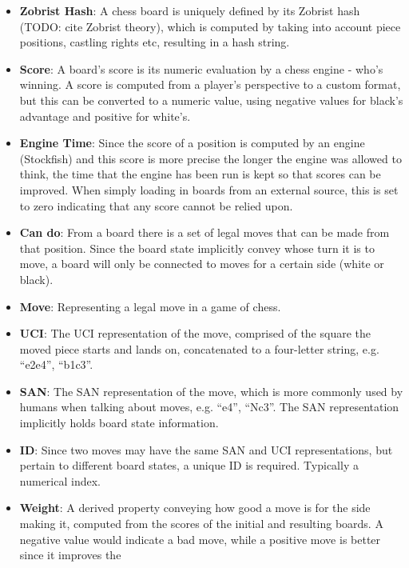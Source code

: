 \documentclass[architecture.tex]{subfiles}
\begin{document}
\begin{itemize}
    \item \textbf{Zobrist Hash}: A chess board is uniquely defined
        by its Zobrist hash (TODO: cite Zobrist theory),
        which is computed by taking into account piece positions,
        castling rights etc, resulting in a hash string.
    \item \textbf{Score}: A board's score is its numeric evaluation by a chess
        engine - who's winning. A score is computed from a player's 
        perspective to a custom format,
        but this can be converted to a numeric value, using negative
        values for black's advantage and positive for white's.
    \item \textbf{Engine Time}: Since the score of a position is computed
        by an engine (Stockfish) and this score is more precise the longer
        the engine was allowed to think, the time that the engine has been
        run is kept so that scores can be improved. When simply loading
        in boards from an external source, this is set to zero
        indicating that any score cannot be relied upon.
    \item \textbf{Can do}: From a board there is a set of legal moves
        that can be made from that position. Since the board state
        implicitly convey whose turn it is to move, a board will
        only be connected to moves for a certain side (white or black).
    \item \textbf{Move}: Representing a legal move in a game of chess. 
    \item \textbf{UCI}: The UCI representation of the move, 
        comprised of the square the moved piece starts and lands on,
        concatenated to a four-letter string, e.g. ``e2e4'', ``b1c3''.
    \item \textbf{SAN}: The SAN representation of the move, which
        is more commonly used by humans when talking about moves,
        e.g. ``e4'', ``Nc3''. The SAN representation implicitly holds
        board state information.
    \item \textbf{ID}: Since two moves may have the same SAN and UCI
        representations, but pertain to different board states,
        a unique ID is required. Typically a numerical index.
    \item \textbf{Weight}: A derived property conveying how good
        a move is for the side making it, computed from the scores
        of the initial and resulting boards. A negative value would indicate
        a bad move, while a positive move is better since it improves the 

\end{itemize}
\end{document}
